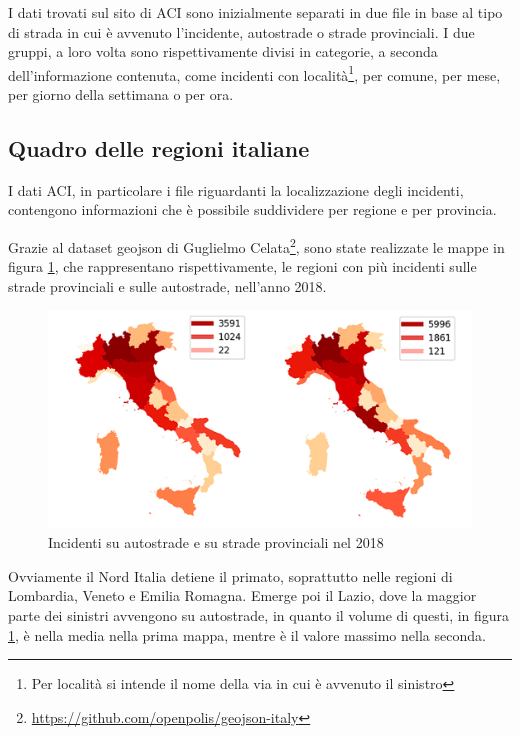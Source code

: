 \documentclass[a4paper,12pt]{report}
\begin{document}
I dati trovati sul sito di ACI sono inizialmente separati in due file in 
base al tipo di strada in cui è avvenuto l'incidente, autostrade o strade provinciali. 
I due gruppi, a loro volta sono rispettivamente divisi in categorie, a seconda 
dell'informazione contenuta, come incidenti con 
località\footnote{Per località si intende il nome della via in cui è avvenuto il sinistro}, 
per comune, per mese, per giorno della settimana o per ora. 

\subsection{Quadro delle regioni italiane}

I dati ACI, in particolare i file riguardanti la 
localizzazione degli incidenti, contengono informazioni che è  
possibile suddividere per regione e per provincia. 

Grazie al dataset geojson di Guglielmo 
Celata\footnote{\url{https://github.com/openpolis/geojson-italy}}, 
sono state realizzate le mappe in figura \ref{fig:incidenti-per-regione}, 
che rappresentano rispettivamente, le regioni con più incidenti 
sulle strade provinciali e sulle autostrade, nell'anno 2018. 

\begin{figure}
    \includegraphics[width=\linewidth]{img_unite/incidenti_autostrade_provinciali.png}
    \caption{Incidenti su autostrade e su strade provinciali nel 2018}
    \label{fig:incidenti-per-regione}
\end{figure}

Ovviamente il Nord Italia detiene il primato, 
soprattutto nelle regioni di Lombardia, Veneto e Emilia Romagna. 
Emerge poi il Lazio, dove la maggior parte dei sinistri avvengono su autostrade, 
in quanto il volume di questi, in figura \ref{fig:incidenti-per-regione}, 
è nella media nella prima mappa, mentre è il valore massimo nella seconda. 
\end{document}
